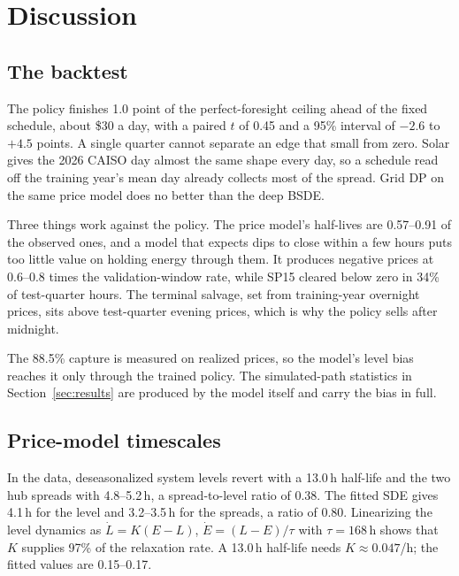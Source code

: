 \documentclass[11pt]{article}
\begin{document}
\section{Discussion}
\label{sec:analysis}

\subsection{The backtest}

The policy finishes 1.0 point of the perfect-foresight ceiling ahead of
the fixed schedule, about \$30 a day, with a paired $t$ of 0.45 and a 95\%
interval of $-2.6$ to $+4.5$ points. A single quarter cannot separate an
edge that small from zero. Solar gives the 2026 CAISO day almost the same
shape every day, so a schedule read off the training year's mean day
already collects most of the spread. Grid DP on the same price model does
no better than the deep BSDE.

Three things work against the policy. The price model's half-lives
are 0.57--0.91 of the observed ones, and a model that expects dips to
close within a few hours puts too little value on holding energy through
them. It produces negative prices at 0.6--0.8 times the validation-window
rate, while SP15 cleared below zero in 34\% of test-quarter hours. The
terminal salvage, set from training-year overnight prices, sits above
test-quarter evening prices, which is why the policy sells after midnight.

The 88.5\% capture is measured on realized prices, so the model's level
bias reaches it only through the trained policy. The simulated-path
statistics in Section~\ref{sec:results} are produced by the model itself
and carry the bias in full.

\subsection{Price-model timescales}

In the data, deseasonalized system levels revert with a 13.0\,h half-life
and the two hub spreads with 4.8--5.2\,h, a spread-to-level ratio of 0.38.
The fitted SDE gives 4.1\,h for the level and 3.2--3.5\,h for the spreads,
a ratio of 0.80. Linearizing the level dynamics as $\dot L = K(E-L)$,
$\dot E = (L-E)/\tau$ with $\tau = 168$\,h shows that $K$ supplies 97\% of
the relaxation rate. A 13.0\,h half-life needs $K \approx 0.047$/h; the
fitted values are 0.15--0.17.
\end{document}
